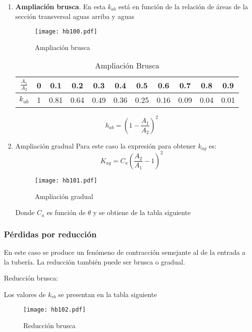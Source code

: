 \begin{enumerate}
    \item \textbf{Ampliación brusca}. En esta $k_{ab}$ está en función de la relación de áreas de la sección transversal aguas arriba y aguas
    \begin{figure}[h!]
    \centering
      \texttt{[image: hb100.pdf]}
      \caption{Ampliación brusca}
      \label{hb100}
    \end{figure}
    \begin{table}[h!]
        \centering
        \begin{tabular}{@{}ccccccccccc@{}}
        \toprule
        $\frac{A_1}{A_2}$ & 0 & 0.1  & 0.2  & 0.3  & 0.4  & 0.5  & 0.6  & 0.7  & 0.8  & 0.9  \\ \midrule
        $k_{ab}$          & 1 & 0.81 & 0.64 & 0.49 & 0.36 & 0.25 & 0.16 & 0.09 & 0.04 & 0.01 \\ \bottomrule
        \end{tabular}
        \caption{Ampliación Brusca}
        \label{tabhb15}
        \end{table}
        \begin{equation}
            h_{ab} =\left(1 - \frac{A_1}{A_2}\right)^2
        \end{equation}
    \item Ampliación gradual
    Para este caso la expresión para obtener $k_{ag}$ es:
    \begin{equation}
        K_{ag} =C_a\left(\frac{A_2}{A_1} - 1\right)^2
    \end{equation}
    \begin{figure}[h!]
    \centering
      \texttt{[image: hb101.pdf]}
      \caption{Ampliación gradual}
      \label{hb101}
    \end{figure}
    Donde $C_a$ es función de $\theta$ y se obtiene de la tabla siguiente
\end{enumerate}

\subsubsection{Pérdidas por reducción}
En este caso se produce un fenómeno de contracción semejante al de la entrada a la tubería. La reducción también puede ser brusca o gradual.

Reducción brusca:

Los valores de $k_{rb}$ se presentan en la tabla siguiente
\begin{figure}[h!]
\centering
  \texttt{[image: hb102.pdf]}
  \caption{Reducción brusca}
  \label{hb102}
\end{figure}

